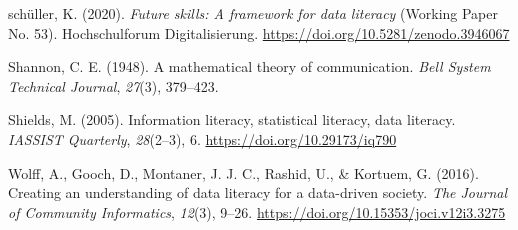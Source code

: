 \documentclass[
  12pt,
  a4paper,
  twoside]{article}
\newlength{\cslhangindent}
\newenvironment{CSLReferences}[2] %
 {\begin{list}{}{%
  \setlength{\itemindent}{0pt}
  \setlength{\leftmargin}{0pt}
  \setlength{\parsep}{0pt}
  \ifodd #1
   \setlength{\leftmargin}{\cslhangindent}
   \setlength{\itemindent}{-1\cslhangindent}
  \fi
  \setlength{\itemsep}{#2\baselineskip}}}
 {\end{list}}
\begin{document}
\begin{CSLReferences}{1}{0}
schüller, K. (2020). \emph{Future skills: A framework for data literacy} (Working Paper No. 53). Hochschulforum Digitalisierung. \url{https://doi.org/10.5281/zenodo.3946067}

Shannon, C. E. (1948). A mathematical theory of communication. \emph{Bell System Technical Journal}, \emph{27}(3), 379--423.

Shields, M. (2005). Information literacy, statistical literacy, data literacy. \emph{IASSIST Quarterly}, \emph{28}(2--3), 6. \url{https://doi.org/10.29173/iq790}

Wolff, A., Gooch, D., Montaner, J. J. C., Rashid, U., \& Kortuem, G. (2016). Creating an understanding of data literacy for a data-driven society. \emph{The Journal of Community Informatics}, \emph{12}(3), 9--26. \url{https://doi.org/10.15353/joci.v12i3.3275}

\end{CSLReferences}
\end{document}
